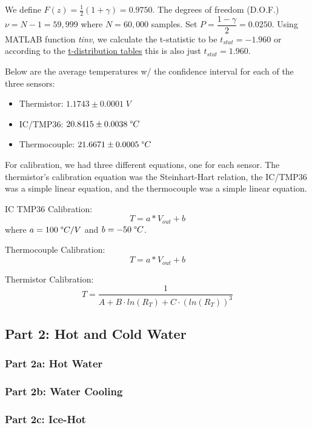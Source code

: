 \documentclass{article}
\begin{document}
We define $F(z) = \frac{1}{2}(1+\gamma) = 0.9750$. The degrees of freedom (D.O.F.) $\nu = N - 1 = 59,999$ where $N=60,000$ samples. Set $P=\dfrac{1-\gamma}{2}=0.0250$. Using MATLAB function \textit{tinv}, we calculate the t-statistic to be $t_{stat} = -1.960$ or according to the \hyperlink{1}{t-distribution tables} this is also just $t_{stat}=1.960$.

Below are the average temperatures w/ the confidence interval for each of the three sensors:
\begin{itemize}
    \item Thermistor: \(1.1743 \pm 0.0001\; V \)
    \item IC/TMP36: \(20.8415 \pm 0.0038\; \degree C\)
    \item Thermocouple: \(21.6671 \pm 0.0005\; \degree C\)
\end{itemize}

For calibration, we had three different equations, one for each sensor. The thermistor's calibration equation was the Steinhart-Hart relation, the IC/TMP36 was a simple linear equation, and the thermocouple was a simple linear equation.

IC TMP36 Calibration:
\[
    T = a * V_{out} + b
\]
where $a = 100\; \degree C/V$ and $b = -50\; \degree C$.

Thermocouple Calibration:
\[
    T = a * V_{out} + b
\]

Thermistor Calibration:
\[
    T = \dfrac{1}{A + B\cdot ln(R_{T}) + C\cdot (ln(R_{T}))^{3}}
\]




\subsection{Part 2: Hot and Cold Water}

\subsubsection{Part 2a: Hot Water} %



\subsubsection{Part 2b: Water Cooling} %


\subsubsection{Part 2c: Ice-Hot} %
\end{document}
